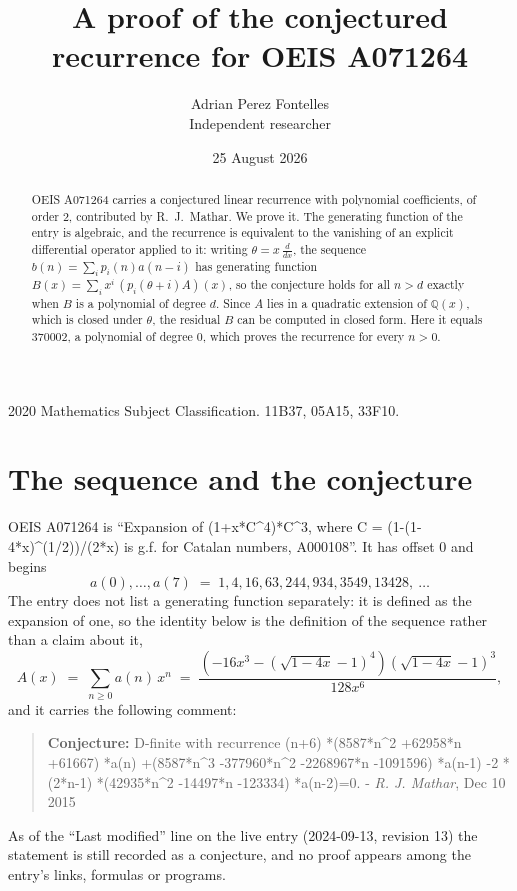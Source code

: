 \documentclass[11pt,a4paper]{article}
\title{A proof of the conjectured recurrence for OEIS A071264}
\author{Adrian Perez Fontelles\\ \small Independent researcher}
\date{25 August 2026}
\theoremstyle{plain}
\theoremstyle{definition}
\begin{document}
\maketitle

\begin{abstract}
OEIS A071264 carries a conjectured linear recurrence with polynomial coefficients, of
order 2, contributed by R.~J.~Mathar. We prove it. The generating function of the
entry is algebraic, and the recurrence is equivalent to the vanishing of an explicit
differential operator applied to it: writing $\theta=x\,\frac{d}{dx}$, the sequence
$b(n)=\sum_{i}p_{i}(n)a(n-i)$ has generating function
$B(x)=\sum_{i}x^{i}\,(p_{i}(\theta+i)A)(x)$, so the conjecture holds for all $n>d$ exactly
when $B$ is a polynomial of degree $d$. Since $A$ lies in a quadratic extension of
$\mathbb{Q}(x)$, which is closed under $\theta$, the residual $B$ can be computed in
closed form. Here it equals $370002$, a polynomial of degree $0$, which proves
the recurrence for every $n>0$.
\end{abstract}

\noindent\small 2020 Mathematics Subject Classification. 11B37, 05A15, 33F10.\normalsize

\section{The sequence and the conjecture}

OEIS A071264 is ``Expansion of (1+x*C\textasciicircum{}4)*C\textasciicircum{}3, where C = (1-(1-4*x)\textasciicircum{}(1/2))/(2*x) is g.f. for Catalan numbers, A000108''. It has offset $0$ and begins
\[
a(0),\dots,a(7)\;=\;1, 4, 16, 63, 244, 934, 3549, 13428,\ \dots
\]
The entry does not list a generating function separately: it is defined as the
expansion of one, so the identity below is the definition of the sequence rather than a
claim about it,
\begin{equation}\label{eq:gf}
A(x)\;=\;\sum_{n\ge 0} a(n)\,x^{n}\;=\;\frac{\left(- 16 x^{3} - \left(\sqrt{1 - 4 x} - 1\right)^{4}\right) \left(\sqrt{1 - 4 x} - 1\right)^{3}}{128 x^{6}} ,
\end{equation}
and it carries the following comment:
\begin{quote}\small
\textbf{Conjecture:} D-finite with recurrence (n+6) *(8587*n\textasciicircum{}2 +62958*n +61667) *a(n) +(8587*n\textasciicircum{}3 -377960*n\textasciicircum{}2 -2268967*n -1091596) *a(n-1) -2 *(2*n-1) *(42935*n\textasciicircum{}2 -14497*n -123334) *a(n-2)=0. - \emph{R. J. Mathar}, Dec 10 2015
\end{quote}
As of the ``Last modified'' line on the live entry (2024-09-13, revision 13) the
statement is still recorded as a conjecture, and no proof appears among the entry's links,
formulas or programs.
\end{document}
